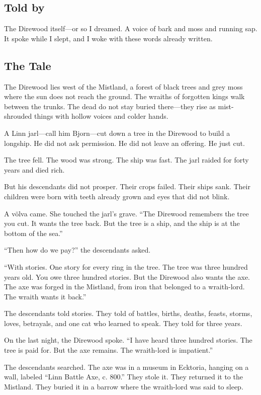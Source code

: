 \documentclass[9pt,a5paper]{extbook}
\begin{document}
\subsection*{Told by}

The Direwood itself---or so I dreamed. A voice of bark and moss and running sap. It spoke while I slept, and I woke with these words already written.

\subsection*{The Tale}

The Direwood lies west of the Mistland, a forest of black trees and grey moss where the sun does not reach the ground. The wraiths of forgotten kings walk between the trunks. The dead do not stay buried there---they rise as mist-shrouded things with hollow voices and colder hands.

A Linn jarl---call him Bjorn---cut down a tree in the Direwood to build a longship. He did not ask permission. He did not leave an offering. He just cut.

The tree fell. The wood was strong. The ship was fast. The jarl raided for forty years and died rich.

But his descendants did not prosper. Their crops failed. Their ships sank. Their children were born with teeth already grown and eyes that did not blink.

A völva came. She touched the jarl's grave. ``The Direwood remembers the tree you cut. It wants the tree back. But the tree is a ship, and the ship is at the bottom of the sea.''

``Then how do we pay?'' the descendants asked.

``With stories. One story for every ring in the tree. The tree was three hundred years old. You owe three hundred stories. But the Direwood also wants the axe. The axe was forged in the Mistland, from iron that belonged to a wraith-lord. The wraith wants it back.''

The descendants told stories. They told of battles, births, deaths, feasts, storms, loves, betrayals, and one cat who learned to speak. They told for three years.

On the last night, the Direwood spoke. ``I have heard three hundred stories. The tree is paid for. But the axe remains. The wraith-lord is impatient.''

The descendants searched. The axe was in a museum in Ecktoria, hanging on a wall, labeled ``Linn Battle Axe, c. 800.'' They stole it. They returned it to the Mistland. They buried it in a barrow where the wraith-lord was said to sleep.
\end{document}

